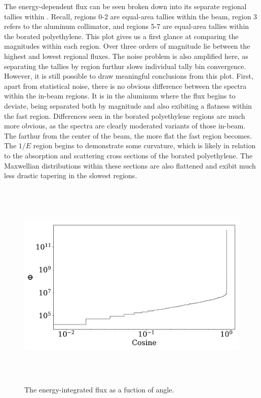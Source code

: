 The energy-dependent flux can be seen broken down into its separate regional tallies within .
Recall, regions 0-2 are equal-area tallies within the beam, region 3 refers to the aluminum collimator, and regions 5-7 are equal-area tallies within the borated polyethylene.
This plot gives us a first glance at comparing the magnitudes within each region.
Over three orders of magnitude lie between the highest and lowest regional fluxes.
The noise problem  is also amplified here, as separating the tallies by region furthur slows individual tally bin convergence.
However, it is still possible to draw meaningful conclusions from this plot.
First, apart from statistical noise, there is no obvious difference between the spectra within the in-beam regions.
It is in the aluminum where the flux begins to deviate, being separated both by magnitude and also exibiting a flatness within the fast region.
Differences seen in the borated polyethylene regions are much more obvious, as the spectra are clearly moderated variants of those in-beam.
The farthur from the center of the beam, the more flat the fast region becomes.
The $1/E$ region begins to demonstrate some curvature, which is likely in relation to the absorption and scattering cross sections of the borated polyethylene.
The Maxwellian distributions within these sections are also flattened and exibit much less drastic tapering in the slowest regions.


%
\begin{figure}[htb]
\centering
\includegraphics[height=4in]{tex/figures/flux_cos.pdf}
\caption[Flux vs. Angle]{The energy-integrated flux as a fuction of angle.}
\label{fig:flux_cos}
\end{figure}

